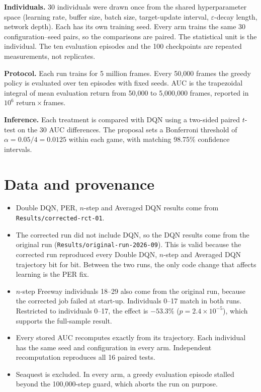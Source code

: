 \documentclass[11pt,a4paper]{article}
\begin{document}
\textbf{Individuals.} 30 individuals were drawn once from the shared
hyperparameter space (learning rate, buffer size, batch size, target-update
interval, $\varepsilon$-decay length, network depth). Each has its own
training seed. Every arm trains the same 30 configuration--seed pairs, so the
comparisons are paired. The statistical unit is the individual. The ten
evaluation episodes and the 100 checkpoints are repeated measurements, not
replicates.

\textbf{Protocol.} Each run trains for 5 million frames. Every 50,000 frames
the greedy policy is evaluated over ten episodes with fixed seeds. AUC is the
trapezoidal integral of mean evaluation return from 50,000 to 5,000,000
frames, reported in $10^6$ return\,$\times$\,frames.

\textbf{Inference.} Each treatment is compared with DQN using a two-sided
paired $t$-test on the 30 AUC differences. The proposal sets a Bonferroni
threshold of $\alpha = 0.05/4 = 0.0125$ within each game, with matching
98.75\% confidence intervals.

\section*{Data and provenance}
\begin{itemize}
    \item Double DQN, PER, $n$-step and Averaged DQN results come from
    \texttt{Results/corrected-rct-01}.
    \item The corrected run did not include DQN, so the DQN results come from
    the original run (\texttt{Results/original-run-2026-09}). This is valid
    because the corrected run reproduced every Double DQN, $n$-step and
    Averaged DQN trajectory bit for bit. Between the two runs, the only code
    change that affects learning is the PER fix.
    \item $n$-step Freeway individuals 18--29 also come from the original run,
    because the corrected job failed at start-up. Individuals 0--17 match in
    both runs. Restricted to individuals 0--17, the effect is $-53.3\%$
    ($p = 2.4\times10^{-5}$), which supports the full-sample result.
    \item Every stored AUC recomputes exactly from its trajectory. Each
    individual has the same seed and configuration in every arm. Independent
    recomputation reproduces all 16 paired tests.
    \item Seaquest is excluded. In every arm, a greedy evaluation episode
    stalled beyond the 100,000-step guard, which aborts the run on purpose.
\end{itemize}
\end{document}
